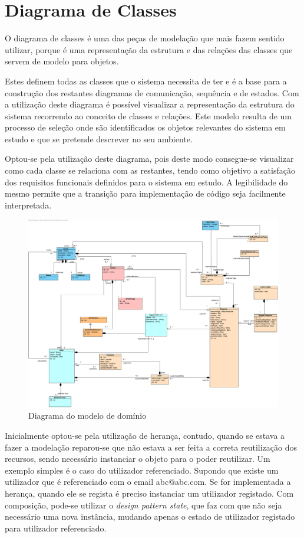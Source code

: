 \section{Diagrama de Classes}

O diagrama de classes é uma das peças de modelação que mais fazem sentido utilizar, porque é uma representação da estrutura e das relações das classes que servem de modelo para objetos.

Estes definem todas as classes que o sistema necessita de ter e é a base para a construção dos restantes diagramas de comunicação, sequência e de estados.
Com a utilização deste diagrama é possível visualizar a representação da estrutura do sistema recorrendo ao conceito de classes e relações. Este modelo resulta de um processo de seleção onde são identificados os objetos relevantes do sistema em estudo e que se pretende descrever no seu ambiente.

Optou-se pela utilização deste diagrama, pois deste modo consegue-se visualizar como cada classe se relaciona com as restantes, tendo como objetivo a satisfação dos requisitos funcionais definidos para o sistema em estudo. A legibilidade do mesmo permite que a transição para implementação de código seja facilmente interpretada.

\begin{figure}[ht]
\centerline{\includegraphics[width=1\textwidth]{images/modeling/diagramaClasses}}
\caption{Diagrama do modelo de domínio}
\label{fig:classDiagram}
\end{figure}

Inicialmente optou-se pela utilização de herança, contudo, quando se estava a fazer a modelação reparou-se que não estava a ser feita a correta reutilização dos recursos, sendo necessário instanciar o objeto para o poder reutilizar. Um exemplo simples é o caso do utilizador referenciado. Supondo que existe um utilizador que é referenciado com o email abc@abc.com. Se for implementada a herança, quando ele se regista é preciso instanciar um utilizador registado. Com composição, pode-se utilizar o \textit{design pattern state}, que faz com que não seja necessário uma nova instância, mudando apenas o estado de utilizador registado para utilizador referenciado.

